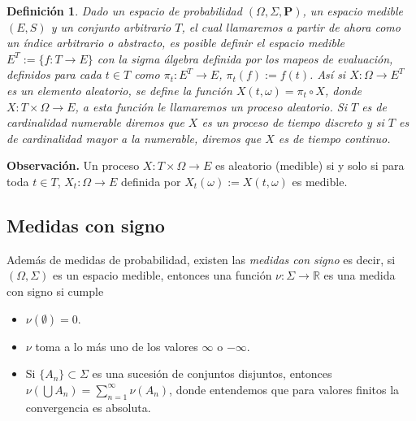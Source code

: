 \documentclass[letterpaper]{article}
\newtheorem{def.}{Definici\'on}[section]
\newcommand{\prob}{\textbf{P}}
\newcommand{\obs}{{\newline \noindent \sc \textbf{Observación. }}}
\newcommand{\om}{\ensuremath{\Omega}}
\newcommand{\sig}{\ensuremath{\Sigma}}
\newcommand{\re}{\ensuremath{\mathbb R }}
\begin{document}
\begin{def.}
Dado un espacio de probabilidad \((\om,\sig,\prob)\), un espacio medible \((E,S)\) y un conjunto arbitrario \(T\), el cual llamaremos a partir de ahora como un \emph{índice arbitrario o abstracto}, es posible definir el espacio medible \(E^{T}:=\{f:T\rightarrow E\}\) con la sigma álgebra definida por los mapeos de evaluación, definidos para cada \(t\in T\) como \(\pi_t:E^{T}\rightarrow E\), \(\pi_t(f):=f(t)\). Así si \(X:\om\rightarrow E^{T}\) es un elemento aleatorio, se define la función \(X(t,\omega)=\pi_t\circ X\), donde \(X:T\times\om\rightarrow E\), a esta función le llamaremos un \emph{proceso aleatorio}. Si \(T\) es de cardinalidad numerable diremos que \(X\) es un proceso de tiempo discreto y si \(T\) es de cardinalidad mayor a la numerable, diremos que \(X\) es de tiempo continuo.
\end{def.}
\obs Un proceso \(X:T\times\om\rightarrow E\) es aleatorio (medible) si y solo si para toda \(t\in T\), \(X_t:\om\rightarrow E\) definida por \(X_t(\omega):=X(t,\omega)\) es medible.

\subsection{Medidas con signo}
\label{sec:orga3529eb}

\noindent Además de medidas de probabilidad, existen las \emph{medidas con signo} es decir, si \((\Omega,\Sigma)\) es un espacio medible, entonces una función \(\nu:\Sigma\rightarrow\re\) es una medida con signo si cumple

\begin{itemize}
\item \(\nu(\emptyset)=0\).
\item \(\nu\) toma a lo más uno de los valores \(\infty\) o \(-\infty\).
\item Si \(\{A_n\}\subset\Sigma\) es una sucesión de conjuntos disjuntos, entonces \(\nu(\bigcup A_n)=\sum_{n=1}^{\infty} \nu(A_n)\), donde entendemos que para valores finitos la convergencia es absoluta.
\end{itemize}
\end{document}
